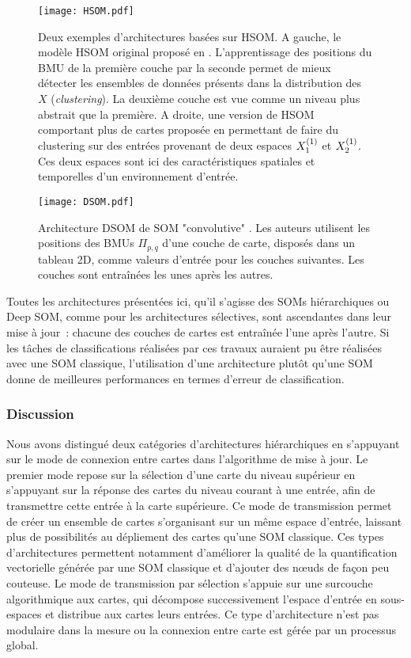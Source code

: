 \documentclass[../main]{subfiles}
\begin{document}
\begin{figure}[t]
    \centering
    \texttt{[image: HSOM.pdf]}
    \caption{Deux exemples d'architectures basées sur HSOM. A gauche, le modèle HSOM original proposé en \cite{lampinen_clustering_1992}. L'apprentissage des positions du BMU de la première couche par la seconde permet de mieux détecter les ensembles de données présents dans la distribution des $X$ (\emph{clustering}).
    La deuxième couche est vue comme un niveau plus abstrait que la première. 
    A droite, une version de HSOM comportant plus de cartes proposée en \cite{hagenauer_hierarchical_2013} permettant de faire du clustering sur des entrées provenant de deux espaces $X_1^{({1})}$ et $X_2^{({1})}$. Ces deux espaces sont ici des caractéristiques spatiales et temporelles d'un environnement d'entrée.
    \label{fig:hsom}}
\end{figure}

\begin{figure}[t]
    \texttt{[image: DSOM.pdf]}
    \caption{Architecture DSOM de SOM "convolutive" \cite{liu_deep_2015}. Les auteurs utilisent les positions des BMUs $\Pi_{p,q}$ d'une couche de carte, disposés dans un tableau 2D, comme valeurs d'entrée pour les couches suivantes. Les couches sont entraînées les unes après les autres. \label{fig:dsom}}
\end{figure}

Toutes les architectures présentées ici, qu'il s'agisse des SOMs hiérarchiques ou Deep SOM, comme pour les architectures sélectives, sont ascendantes dans leur mise à jour~: chacune des couches de cartes est entraînée l'une après l'autre. 
Si les tâches de classifications réalisées par ces travaux auraient pu être réalisées avec une SOM classique, l'utilisation d'une architecture plutôt qu'une SOM donne de meilleures performances en termes d'erreur de classification.

\subsubsection{Discussion}

Nous avons distingué deux catégories d'architectures hiérarchiques en s'appuyant sur le mode de connexion entre cartes dans l'algorithme de mise à jour. 
Le premier mode repose sur la sélection d'une carte du niveau supérieur en s'appuyant sur la réponse des cartes du niveau courant à une entrée, afin de transmettre cette entrée à la carte supérieure. Ce mode de transmission permet de créer un ensemble de cartes s'organisant sur un même espace d'entrée, laissant plus de possibilités au dépliement des cartes qu'une SOM classique. Ces types d'architectures permettent notamment d'améliorer la qualité de la quantification vectorielle générée par une SOM classique et d'ajouter des n\oe{}uds de façon peu couteuse. Le mode de transmission par sélection s'appuie sur une surcouche algorithmique aux cartes, qui décompose successivement l'espace d'entrée en sous-espaces et distribue aux cartes leurs entrées. Ce type d'architecture n'est pas modulaire dans la mesure ou la connexion entre carte est gérée par un processus global.
\end{document}
